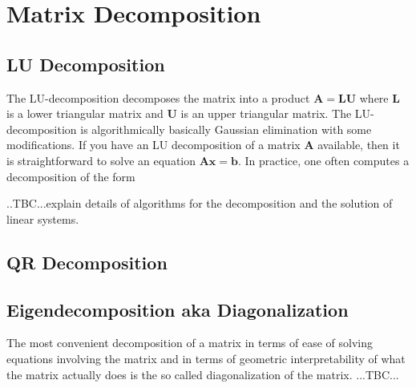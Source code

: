\section{Matrix Decomposition}




\subsection{LU Decomposition}
The LU-decomposition decomposes the matrix into a product $\mathbf{A = L U}$ where $\mathbf{L}$ is a lower triangular matrix and $\mathbf{U}$ is an upper triangular matrix. The LU-decomposition is algorithmically basically Gaussian elimination with some modifications. If you have an LU decomposition of a matrix $\mathbf{A}$ available, then it is straightforward to solve an equation $\mathbf{Ax = b}$. In practice, one often computes a decomposition of the form 

..TBC...explain details of algorithms for the decomposition and the solution of linear systems.


\subsection{QR Decomposition}


\subsection{Eigendecomposition aka Diagonalization}
The most convenient decomposition of a matrix in terms of ease of solving equations involving the matrix and in terms of geometric interpretability of what the matrix actually does is the so called diagonalization of the matrix. ...TBC...


